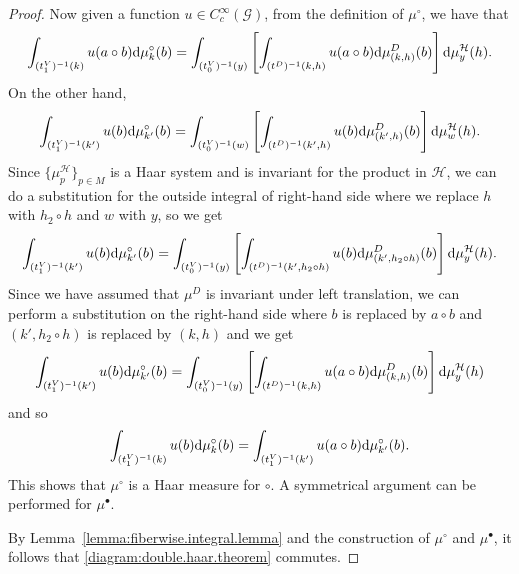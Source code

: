 \documentclass[10pt,a4paper]{amsart}
\numberwithin{equation}{section}
\theoremstyle{definition}
\newcommand{\CG}{\mathcal{G}}
\newcommand{\CH}{\mathcal{H}}
\newcommand{\inv}{^{-1}}
\begin{document}
\begin{proof}
Now given a function $ u \in C^\infty_c(\CG) $, from the definition of $ \mu^\circ $, we have that
       \[ \int_{(t^V_1)\inv(k)} u(a \circ b) {\rm d} \mu_k^\circ(b) = \int_{(t^V_0)\inv(y)} \left[ \int_{(t^D)\inv(k,h)} u(a \circ b) {\rm d} \mu_{(k,h)}^D(b) \right] {\rm d} \mu_{y}^\CH(h).
     \]
    On the other hand,
    \[
       \int_{(t^V_1)\inv(k')} u( b) {\rm d} \mu_{k'}^\circ (b) = \int_{(t^V_0)\inv(w)} \left[ \int_{(t^D)\inv(k', h)} u( b) {\rm d} \mu_{(k',h)}^D(b) \right] {\rm d} \mu_{w}^\CH(h).
    \]
       Since $ \big\{ \mu_p^\CH\big\}_{p \in M } $ is a Haar system and is invariant for the product in $ \CH $, we can do a substitution for the outside integral of right-hand side where we replace $ h $ with $ h_2 \circ h $ and $ w $ with $ y $, so we get
    \[
       \int_{(t^V_1)\inv(k')} u( b) {\rm d} \mu_{k'}^\circ (b) = \int_{(t^V_0)\inv(y)} \left[ \int_{(t^D)\inv(k', h_2 \circ h)} u(b) {\rm d} \mu_{(k', h_2 \circ h)}^D(b) \right] {\rm d} \mu_{y}^\CH(h).
    \]
       Since we have assumed that $ \mu^D $ is invariant under left translation, we can perform a substitution on the right-hand side where $ b $ is replaced by $ a \circ b $ and $ (k', h_2 \circ h)$ is replaced by $ (k,h) $ and we get
     \[
       \int_{(t^V_1)\inv(k')} u( b) {\rm d} \mu_{k'}^\circ (b) = \int_{(t^V_0)\inv(y)} \left[ \int_{(t^D)\inv(k,h)} u(a \circ b) {\rm d} \mu_{(k,h)}^D(b) \right] {\rm d} \mu_{y}^\CH(h)
    \]
    and so
    \[
     \int_{(t^V_1)\inv(k)} u(b) {\rm d} \mu_{k}^\circ(b) = \int_{(t^V_1)\inv(k')} u( a \circ b) {\rm d} \mu_{k'}^\circ (b).
    \]
  This shows that $ \mu^\circ $ is a Haar measure for $ \circ $. A symmetrical argument can be performed for $ \mu^\bullet $.

  By Lemma~\ref{lemma:fiberwise.integral.lemma} and the construction of $ \mu^\circ $ and $ \mu^\bullet $, it follows that \eqref{diagram:double.haar.theorem} commutes.
  \end{proof}
\end{document}
